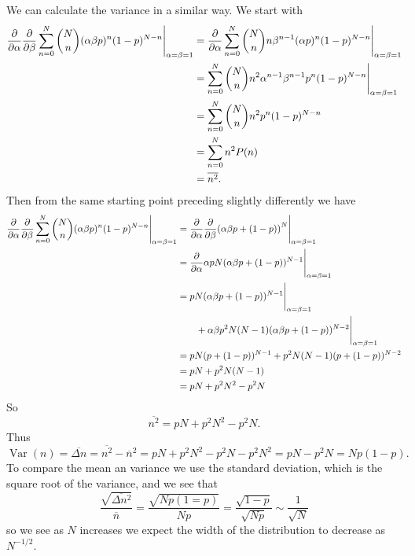 \documentclass[a4paper]{article}
\newcommand{\mean}[1]{\overline{#1}}
\DeclareMathOperator{\Var}{Var}
\begin{document}
    We can calculate the variance in a similar way.
    We start with 
    \begin{align*}
        \pdv{\alpha}\pdv{\beta}\sum_{n=0}^{N} {N\choose n}(\alpha\beta p)^n(1 - p)^{N-n}\Bigg\vert_{\alpha = \beta = 1} &= \pdv{\alpha}\sum_{n=0}^{N} {N\choose n}n\beta^{n-1}(\alpha p)^n(1 - p)^{N-n}\Bigg\vert_{\alpha = \beta = 1}\\
        &= \sum_{n=0}^{N} {N\choose n}n^2\alpha^{n-1}\beta^{n-1}p^n(1 - p)^{N-n}\Bigg\vert_{\alpha = \beta = 1}\\
        &= \sum_{n=0}^{N} {N\choose n}n^2 p^n(1 - p)^{N-n}\\
        &= \sum_{n=0}^{N} n^2P(n)\\
        &= \mean{n^2}.
    \end{align*}
    Then from the same starting point preceding slightly differently we have
    \begin{align*}
        \pdv{\alpha}\pdv{\beta}\sum_{n=0}^{N} {N\choose n}(\alpha\beta p)^n(1 - p)^{N-n}\Bigg\vert_{\alpha = \beta = 1} &= \pdv{\alpha}\pdv{\beta} (\alpha\beta p + (1 - p))^{N}\Bigg\vert_{\alpha = \beta = 1}\\
        &= \pdv{\alpha} \alpha pN(\alpha\beta p + (1 - p))^{N-1}\Bigg\vert_{\alpha = \beta = 1}\\
        &=  pN(\alpha\beta p + (1 - p))^{N-1}\Bigg\vert_{\alpha = \beta = 1} \\
        &\qquad+ \alpha\beta p^2N(N - 1)(\alpha\beta p + (1 - p))^{N - 2}\Bigg\vert_{\alpha = \beta = 1}\\
        &= pN(p + (1 - p))^{N - 1} + p^2N(N - 1)(p + (1 - p))^{N - 2}\\
        &= pN + p^2N(N - 1)\\
        &= pN + p^2N^2 - p^2N
    \end{align*}
    So
    \[\mean{n^2} = pN + p^2N^2 - p^2N.\]
    Thus
    \[\Var(n) = \mean{\Delta n} = \mean{n^2} - \mean{n}^2 = pN + p^2N^2 -p^2N - p^2N^2 = pN - p^2N = Np(1 - p).\]
    To compare the mean an variance we use the standard deviation, which is the square root of the variance, and we see that
    \[\frac{\sqrt{\mean{\Delta n^2}}}{\mean{n}} = \frac{\sqrt{Np(1 = p)}}{Np} = \frac{\sqrt{1 - p}}{\sqrt{Np}} \sim \frac{1}{\sqrt{N}}\]
    so we see as \(N\) increases we expect the width of the distribution to decrease as \(N^{-1/2}\).
    
\end{document}
